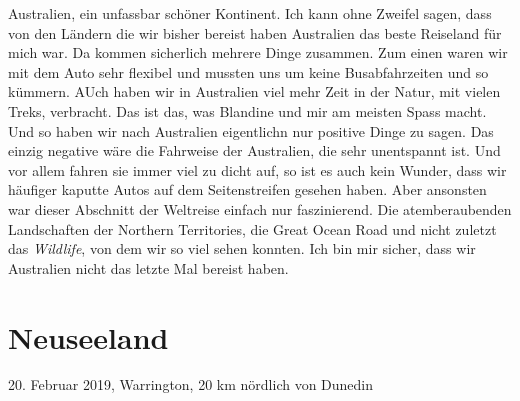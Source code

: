 \documentclass[11pt]{book}
\begin{document}
Australien, ein unfassbar schöner Kontinent. Ich kann ohne Zweifel sagen, dass von den Ländern die wir bisher bereist haben Australien 
das beste Reiseland für mich war. Da kommen sicherlich mehrere Dinge zusammen. Zum einen waren wir mit dem Auto sehr flexibel und mussten 
uns um keine Busabfahrzeiten und so kümmern. AUch haben wir in Australien viel mehr Zeit in der Natur, mit vielen Treks, verbracht. 
Das ist das, was Blandine und mir am meisten Spass macht. Und so haben wir nach Australien eigentlichn nur positive Dinge zu sagen. Das einzig 
negative wäre die Fahrweise der Australien, die sehr unentspannt ist. Und vor allem fahren sie immer viel zu dicht auf, so ist es 
auch kein Wunder, dass wir häufiger kaputte Autos auf dem Seitenstreifen gesehen haben. Aber ansonsten war dieser Abschnitt der 
Weltreise einfach nur faszinierend. Die atemberaubenden Landschaften der Northern Territories, die Great Ocean Road und nicht zuletzt 
das \emph{Wildlife}, von dem wir so viel sehen konnten. Ich bin mir sicher, dass wir Australien nicht das letzte Mal bereist haben.



\chapter{Neuseeland}

20. Februar 2019, Warrington, 20 km nördlich von Dunedin
\end{document}
